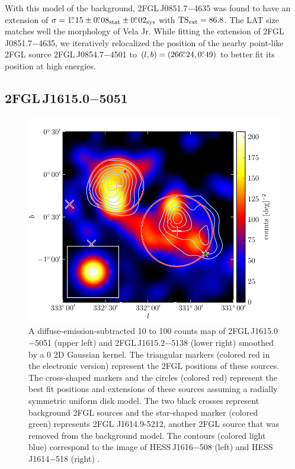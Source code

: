 With this model of the background, 2FGL\,J0851.7$-$4635 was found to
have an extension of $\sigma=1\mbox{$.\!\!^\circ$}15\pm0\mbox{$.\!\!^\circ$}08_\text{stat}\pm0\mbox{$.\!\!^\circ$}02_\text{sys}$
with $\mathrm{TS}_\mathrm{ext}=86.8$.  The LAT size matches well the \tev morphology
of Vela Jr.  While fitting the extension of 2FGL\,J0851.7$-$4635,
we iteratively relocalized the position of the nearby point-like 2FGL
source 2FGL\,J0854.7$-$4501 to $(l,b)=(266\mbox{$.\!\!^\circ$}24,0\mbox{$.\!\!^\circ$}49)$ to better
fit its position at high energies.
    
\subsection{2FGL\,J1615.0$-$5051}

\begin{figure}[htbp]
  \includegraphics{source_plots/source_HESS_J1614-518_color.pdf}
  \caption{A diffuse-emission-subtracted 10 \gev to 100 \gev counts map
  of 2FGL\,J1615.0$-$5051 (upper left) and 2FGL\,J1615.2$-$5138 (lower
  right) smoothed by a 0 2D Gaussian kernel.  The triangular markers
  (colored red in the electronic version) represent the 2FGL positions
  of these sources.  The cross-shaped markers and the circles (colored
  red) represent the best fit positions and extensions of these sources
  assuming a radially symmetric uniform disk model.  The two black
  crosses represent  background 2FGL sources and the star-shaped marker
  (colored green) represents 2FGL J1614.9-5212, another 2FGL source
  that was removed from the background model. The contours (colored
  light blue) correspond to the \tev image of HESS\,J1616$-$508 (left)
  and HESS\,J1614$-$518 (right) \citep{aharonian_2006a_h.e.s.s.-survey}.}
\end{figure}

